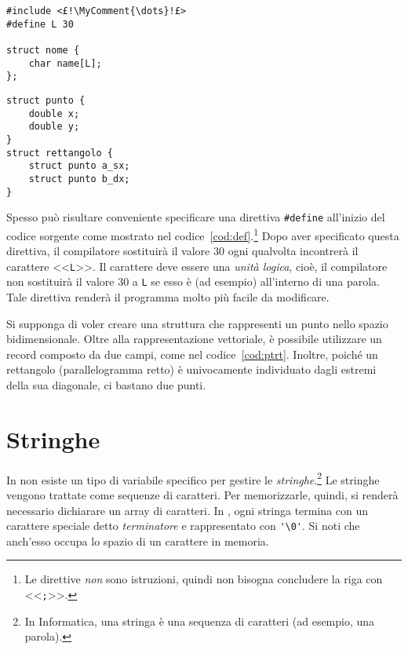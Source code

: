 \begin{code}
\begin{minipage}{0.45\columnwidth}
	\begin{lstlisting}[caption={\em La direttiva \lstinline?\#define?.}, label={cod:def}]
#include <£!\MyComment{\dots}!£>
#define L 30

struct nome {
	char name[L];
};
	\end{lstlisting}
\end{minipage}	\hfill
\begin{minipage}{0.45\columnwidth}
	\begin{lstlisting}[caption={\em Punto e rettangolo.}, label={cod:ptrt}]
struct punto {
	double x;
	double y;
}
struct rettangolo {
	struct punto a_sx;
	struct punto b_dx;
}
	\end{lstlisting}
\end{minipage}

\end{code}
Spesso  può risultare conveniente specificare una direttiva \lstinline!#define! all'inizio del codice sorgente come mostrato nel codice~\vref{cod:def}.\footnote{Le direttive \emph{non} sono istruzioni, quindi non bisogna concludere la riga con <<\lstinline!;!>>.}
Dopo aver specificato questa direttiva, il compilatore sostituirà il valore \num{30} ogni qualvolta incontrerà il carattere <<\lstinline!L!>>.
Il carattere deve essere una \emph{unità logica}, cioè, il compilatore non sostituirà il valore \num{30} a \lstinline!L! se esso è (ad esempio) all'interno di una parola.
Tale direttiva renderà il programma molto più facile da modificare.

Si supponga di voler creare una struttura che rappresenti un punto nello spazio bidimensionale.
Oltre alla rappresentazione vettoriale, è possibile utilizzare un record composto da due campi, come nel codice~\ref{cod:ptrt}.
Inoltre, poiché un rettangolo (parallelogramma retto) è univocamente individuato dagli estremi della sua diagonale, ci bastano due punti.



	\section{Stringhe}
In  non esiste un tipo di variabile specifico per gestire le \emph{stringhe}.\footnote{In Informatica, una stringa è una sequenza di caratteri (ad esempio, una parola).}
Le stringhe vengono trattate come sequenze di caratteri.
Per memorizzarle, quindi, si renderà necessario dichiarare un array di caratteri.
In , ogni stringa termina con un carattere speciale detto \emph{terminatore} e rappresentato con  \lstinline!'\0'!.
Si noti che anch'esso occupa lo spazio di un carattere in memoria.

